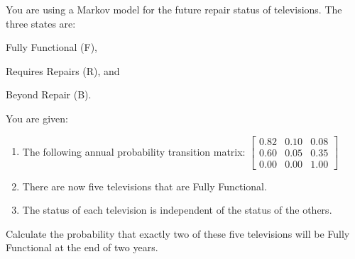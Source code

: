 You are using a Markov model for the future repair status of televisions. The three states are:
\begin{description}
 \item Fully Functional (F),
 \item Requires Repairs (R), and
 \item Beyond Repair (B).
\end{description}
You are given:
\begin{enumerate}
\item The following annual probability transition matrix:
  $\left[\begin{array}{ccc} 0.82 & 0.10 & 0.08 \\ 0.60 & 0.05 & 0.35 \\ 0.00 & 0.00 & 1.00 \end{array}\right]$
\item There are now five televisions that are Fully Functional.
\item The status of each television is independent of the status of the others.
\end{enumerate}
Calculate the probability that exactly two of these five televisions will be Fully
Functional at the end of two years.



